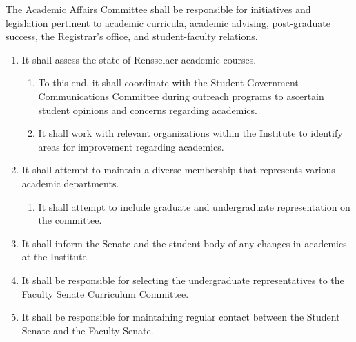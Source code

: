 \item The Academic Affairs Committee shall be responsible for initiatives and legislation pertinent to academic curricula, academic
advising, post-graduate success, the Registrar’s office, and student-faculty relations.
\begin{enumerate}
\item It shall assess the state of Rensselaer academic courses.
\begin{enumerate}
\item To this end, it shall coordinate with the Student Government Communications Committee during outreach programs
to ascertain student opinions and concerns regarding academics.
\item It shall work with relevant organizations within the Institute to identify areas for improvement regarding academics.
\end{enumerate}
\item It shall attempt to maintain a diverse membership that represents various academic departments.
\begin{enumerate}
\item It shall attempt to include graduate and undergraduate representation on the committee.
\end{enumerate}
\item It shall inform the Senate and the student body of any changes in academics at the Institute.
\item It shall be responsible for selecting the undergraduate representatives to the Faculty Senate Curriculum Committee.
\item It shall be responsible for maintaining regular contact between the Student Senate and the Faculty Senate.
\end{enumerate}